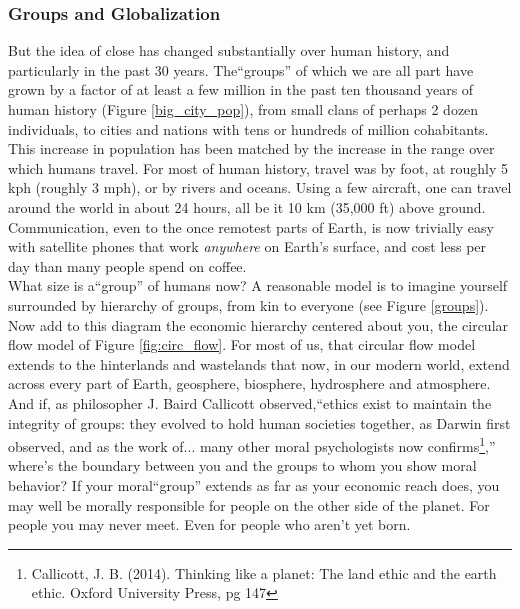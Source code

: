 \documentclass[amstex,12pt]{book}
\begin{document}
\subsubsection{Groups and Globalization}\label{groups_global}
But the idea of close has changed substantially over human history, and particularly in the past 30 years. The``groups'' of which we are all part have grown by a factor of at least a few million in the past ten thousand years of human history (Figure \ref{big_city_pop}), from small clans of perhaps 2 dozen individuals, to cities and nations with tens or hundreds of million cohabitants. This increase in population has been matched by the increase in the range over which humans travel. For most of human history, travel was by foot, at roughly 5 kph (roughly 3 mph), or by rivers and oceans. Using a few aircraft, one can travel around the world in about 24 hours, all be it 10 km (35,000 ft) above ground. Communication, even to the once remotest parts of Earth, is now trivially easy with satellite phones that work \emph{anywhere} on Earth's surface, and cost less per day than many people spend on coffee. \\

What size is a``group'' of humans now? A reasonable model is to imagine yourself surrounded by  hierarchy of groups, from kin to everyone (see Figure \ref{groups}). Now add to this diagram the economic hierarchy centered about you, the circular flow model of Figure \ref{fig:circ_flow}. For most of us, that circular flow model extends to the hinterlands and wastelands that now, in our modern world, extend across every part of Earth, geosphere, biosphere, hydrosphere and atmosphere. And if, as philosopher J. Baird Callicott observed,``ethics exist to maintain the integrity of groups: they evolved to hold human societies together, as Darwin first observed, and as the work of... many other moral psychologists now confirms\footnote{Callicott, J. B. (2014). Thinking like a planet: The land ethic and the earth ethic. Oxford University Press, pg 147},'' where's the boundary between you and the groups to whom you show moral behavior? If your moral``group'' extends as far as your economic reach does, you may well be morally responsible for people on the other side of the planet. For people you may never meet. Even for people who aren't yet born.\\
\end{document}
